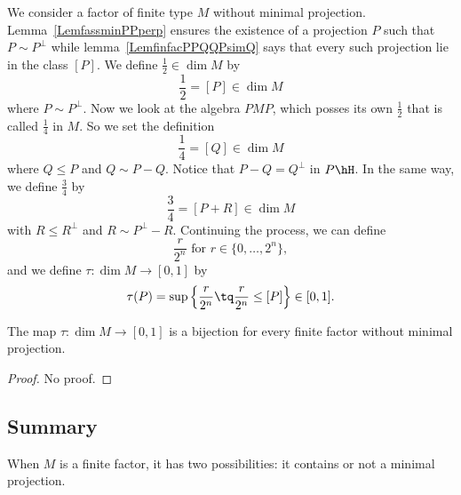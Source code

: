 We consider a factor of finite type $M$ without minimal projection. Lemma~\ref{LemfassminPPperp} ensures the existence of a projection $P$ such that $P\sim P^{\perp}$ while lemma~\ref{LemfinfacPPQQPsimQ} says that every such projection lie in the class $[P]$. We define $\frac{ 1 }{2}\in\dim M$ by
\begin{equation}
	\frac{ 1 }{2}=[P]\in\dim M
\end{equation}
where $P\sim P^{\perp}$. Now we look at the algebra $PMP$, which posses its own $\frac{ 1 }{2}$ that is called $\frac{1}{ 4 }$ in $M$. So we set the definition
\begin{equation}
	\frac{1}{ 4 }=[Q]\in\dim M
\end{equation}
where $Q\leq P$ and $Q\sim P-Q$. Notice that $P-Q=Q^{\perp}$ in $P\hH$. In the same way, we define $\frac{ 3 }{ 4 }$ by
\begin{equation}
	\frac{ 3 }{ 4 }=[P+R]\in\dim M
\end{equation}
with $R\leq R^{\perp}$ and $R\sim P^{\perp}-R$. Continuing the process, we can define
\[
	\frac{ r }{ 2^n }\text{ for } r\in\{ 0,\ldots, 2^n \},
\]
and we define $\tau\colon \dim M\to [0,1]$ by
\begin{equation}
	\tau(P)=\sup\Big\{ \frac{ r }{ 2^n }\tq \frac{ r }{ 2^n }\leq [P] \Big\}\in [0,1].
\end{equation}

\begin{theorem}		\label{ThobijzudimM}
	The map $\tau\colon \dim M\to [0,1]$ is a bijection for every finite factor without minimal projection.
\end{theorem}

\begin{proof}
	No proof.
\end{proof}

\subsection{Summary}

When $M$ is a finite factor, it has two possibilities: it contains or not a minimal projection.

